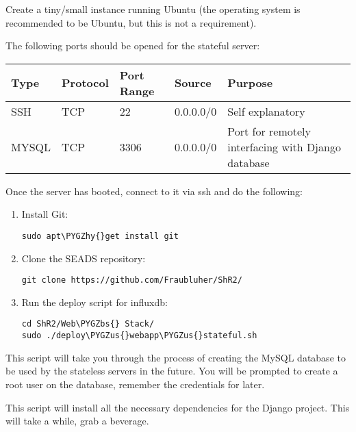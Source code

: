 \documentclass[letterpaper,10pt,english]{sphinxmanual}
\def\PYGZbs{\char`\\}
\def\PYGZus{\char`\_}
\def\PYGZhy{\char`\-}
\begin{document}
Create a tiny/small instance running Ubuntu (the operating system is recommended to be Ubuntu, but this is not a requirement).

The following ports should be opened for the stateful server:

\begin{tabulary}{\linewidth}{|L|L|L|L|L|}
\hline
\textsf{\relax 
Type
} & \textsf{\relax 
Protocol
} & \textsf{\relax 
Port Range
} & \textsf{\relax 
Source
} & \textsf{\relax 
Purpose
}\\
\hline
SSH
 & 
TCP
 & 
22
 & 
0.0.0.0/0
 & 
Self explanatory
\\
\hline
MYSQL
 & 
TCP
 & 
3306
 & 
0.0.0.0/0
 & 
Port for remotely interfacing with Django database
\\
\hline\end{tabulary}


Once the server has booted, connect to it via ssh and do the following:
\begin{enumerate}
\item {} 
Install Git:

\begin{Verbatim}[commandchars=\\\{\}]
sudo apt\PYGZhy{}get install git
\end{Verbatim}

\item {} 
Clone the SEADS repository:

\begin{Verbatim}[commandchars=\\\{\}]
git clone https://github.com/Fraubluher/ShR2/
\end{Verbatim}

\item {} 
Run the deploy script for influxdb:

\begin{Verbatim}[commandchars=\\\{\}]
cd ShR2/Web\PYGZbs{} Stack/
sudo ./deploy\PYGZus{}webapp\PYGZus{}stateful.sh
\end{Verbatim}

\end{enumerate}

This script will take you through the process of creating the MySQL database to be used by the stateless servers in the future. You will be prompted to create a root user on the database, remember the credentials for later.

This script will install all the necessary dependencies for the Django project. This will take a while, grab a beverage.
\end{document}
